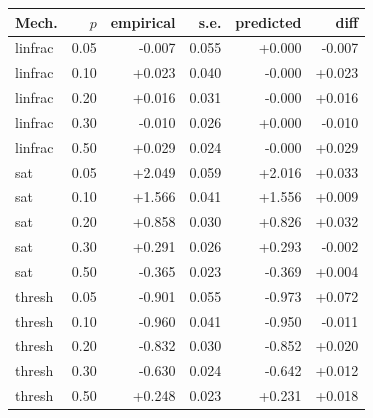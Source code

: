 \begin{tabular}{lrrrrr}
\toprule
Mech. & $p$ & empirical & s.e. & predicted & diff \\
\midrule
linfrac & 0.05 & -0.007 & 0.055 & +0.000 & -0.007 \\
linfrac & 0.10 & +0.023 & 0.040 & -0.000 & +0.023 \\
linfrac & 0.20 & +0.016 & 0.031 & -0.000 & +0.016 \\
linfrac & 0.30 & -0.010 & 0.026 & +0.000 & -0.010 \\
linfrac & 0.50 & +0.029 & 0.024 & -0.000 & +0.029 \\
sat & 0.05 & +2.049 & 0.059 & +2.016 & +0.033 \\
sat & 0.10 & +1.566 & 0.041 & +1.556 & +0.009 \\
sat & 0.20 & +0.858 & 0.030 & +0.826 & +0.032 \\
sat & 0.30 & +0.291 & 0.026 & +0.293 & -0.002 \\
sat & 0.50 & -0.365 & 0.023 & -0.369 & +0.004 \\
thresh & 0.05 & -0.901 & 0.055 & -0.973 & +0.072 \\
thresh & 0.10 & -0.960 & 0.041 & -0.950 & -0.011 \\
thresh & 0.20 & -0.832 & 0.030 & -0.852 & +0.020 \\
thresh & 0.30 & -0.630 & 0.024 & -0.642 & +0.012 \\
thresh & 0.50 & +0.248 & 0.023 & +0.231 & +0.018 \\
\bottomrule
\end{tabular}
